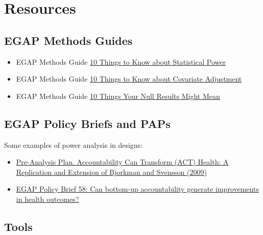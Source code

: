 \documentclass[12pt,]{book}
\begin{document}
\hypertarget{resources-5}{%
\section{Resources}\label{resources-5}}

\hypertarget{egap-methods-guides-5}{%
\subsection{EGAP Methods Guides}\label{egap-methods-guides-5}}

\begin{itemize}
\item
  EGAP Methods Guide \href{https://egap.org/resource/10-things-you-need-know-about-statistical-power/}{10 Things to Know about Statistical Power}
\item
  EGAP Methods Guide \href{https://egap.org/resource/10-things-to-know-about-covariate-adjustment/}{10 Things to Know about Covariate Adjustment}
\item
  EGAP Methods Guide \href{https://egap.org/resource/10-things-your-null-result-might-mean/}{10 Things Your Null Results Might Mean}
\end{itemize}

\hypertarget{egap-policy-briefs-and-paps}{%
\subsection{EGAP Policy Briefs and PAPs}\label{egap-policy-briefs-and-paps}}

Some examples of power analysis in designs:

\begin{itemize}
\item
  \href{https://osf.io/qxwmu/}{Pre-Analysis Plan. Accountability Can Transform (ACT) Health: A Replication and Extension of Bjorkman and Svensson (2009)}
\item
  \href{https://egap.org/resource/does-bottom-up-accountability-work-evidence-from-uganda/}{EGAP Policy Brief 58: Can bottom-up accountability generate improvements in health outcomes?}
\end{itemize}

\hypertarget{tools-3}{%
\subsection{Tools}\label{tools-3}}
\end{document}
